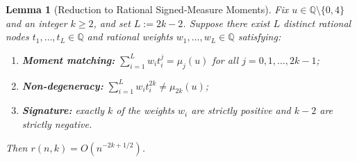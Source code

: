\documentclass[11pt,a4paper]{article}
\newtheorem{lemma}[theorem]{Lemma}
\theoremstyle{definition}
\theoremstyle{remark}
\newcommand{\QQ}{\mathbb{Q}}
\begin{document}
\begin{lemma}[Reduction to Rational Signed-Measure Moments]
\label{lem:moment-reduction}
Fix $u \in \QQ \setminus \{0, 4\}$ and an integer $k \ge 2$, and set $L := 2k - 2$. Suppose there exist $L$ distinct rational nodes $t_1, \dots, t_L \in \QQ$ and rational weights $w_1, \dots, w_L \in \QQ$ satisfying:
\begin{enumerate}
\item[(1)] \textbf{Moment matching:} $\sum_{i=1}^L w_i t_i^j = \mu_j(u)$ for all $j = 0, 1, \dots, 2k - 1$;
\item[(2)] \textbf{Non-degeneracy:} $\sum_{i=1}^L w_i t_i^{2k} \neq \mu_{2k}(u)$;
\item[(3)] \textbf{Signature:} exactly $k$ of the weights $w_i$ are strictly positive and $k - 2$ are strictly negative.
\end{enumerate}
Then $r(n, k) = O\!\left(n^{-2k + 1/2}\right)$.
\end{lemma}
\end{document}
